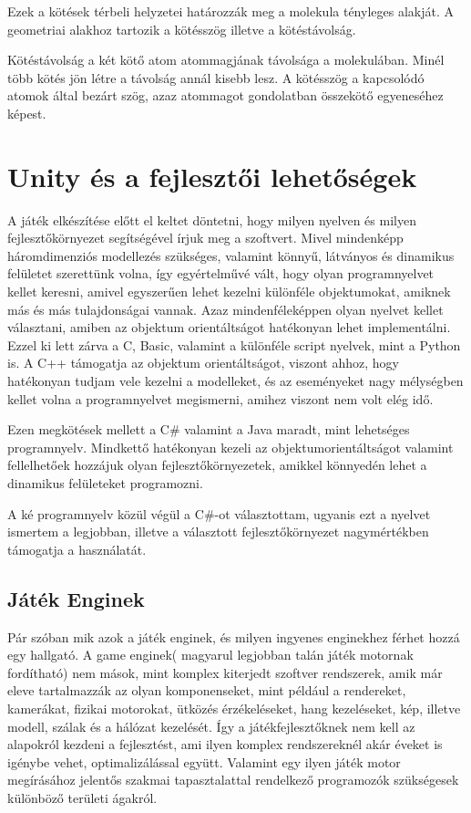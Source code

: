 \documentclass[colorlinks]{thesis-ekf}
\theoremstyle{definition}
\theoremstyle{remark}
\begin{document}
Ezek a kötések térbeli helyzetei határozzák meg a molekula tényleges alakját. A geometriai alakhoz tartozik a kötésszög illetve a kötéstávolság. 

Kötéstávolság a két kötő atom atommagjának távolsága a molekulában. Minél több kötés jön létre a távolság annál kisebb lesz. A kötésszög a kapcsolódó atomok által bezárt szög, azaz atommagot gondolatban összekötő egyeneséhez képest. \cite{eke_kemia_ppt}
\chapter{Unity és a fejlesztői lehetőségek}
A játék elkészítése előtt el keltet döntetni, hogy milyen nyelven és milyen fejlesztőkörnyezet segítségével írjuk meg a szoftvert. Mivel mindenképp háromdimenziós modellezés szükséges, valamint könnyű, látványos és dinamikus felületet szerettünk volna, így egyértelművé vált, hogy olyan programnyelvet kellet keresni, amivel egyszerűen lehet kezelni különféle objektumokat, amiknek más és más tulajdonságai vannak. Azaz mindenféleképpen olyan nyelvet kellet választani, amiben az objektum orientáltságot hatékonyan lehet implementálni. Ezzel ki lett zárva a C, Basic, valamint a különféle script nyelvek, mint a Python is. A C++ támogatja az objektum orientáltságot, viszont ahhoz, hogy hatékonyan tudjam vele kezelni a modelleket, és az eseményeket nagy mélységben kellet volna a programnyelvet megismerni, amihez viszont nem volt elég idő. 

Ezen megkötések mellett a C\# valamint a Java maradt, mint lehetséges programnyelv. Mindkettő hatékonyan kezeli az objektumorientáltságot valamint fellelhetőek hozzájuk olyan fejlesztőkörnyezetek, amikkel könnyedén lehet a dinamikus felületeket programozni.

A ké programnyelv közül végül a C\#-ot választottam, ugyanis ezt a nyelvet ismertem a legjobban, illetve a választott fejlesztőkörnyezet nagymértékben támogatja a használatát.

\section{Játék Enginek}

Pár szóban mik azok a játék enginek, és milyen ingyenes enginekhez férhet hozzá egy hallgató. A game enginek( magyarul legjobban talán játék motornak fordítható) nem mások, mint komplex kiterjedt szoftver rendszerek, amik már eleve tartalmazzák az olyan komponenseket, mint például a rendereket, kamerákat, fizikai motorokat, ütközés érzékeléseket, hang kezeléseket, kép, illetve modell, szálak és a hálózat kezelését.\cite{wiki_game_engine} Így a játékfejlesztőknek nem kell az alapokról kezdeni a fejlesztést, ami ilyen komplex rendszereknél akár éveket is igénybe vehet, optimalizálással együtt. Valamint egy ilyen játék motor megírásához jelentős szakmai tapasztalattal rendelkező programozók szükségesek különböző területi ágakról.
\end{document}

